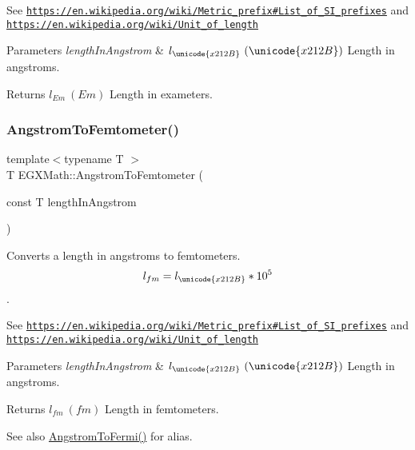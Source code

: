 See \href{https://en.wikipedia.org/wiki/Metric_prefix#List_of_SI_prefixes}{\tt https\+://en.\+wikipedia.\+org/wiki/\+Metric\+\_\+prefix\#\+List\+\_\+of\+\_\+\+S\+I\+\_\+prefixes} and \href{https://en.wikipedia.org/wiki/Unit_of_length}{\tt https\+://en.\+wikipedia.\+org/wiki/\+Unit\+\_\+of\+\_\+length} 
\begin{DoxyParams}{Parameters}
{\em length\+In\+Angstrom} & $ l_{\unicode{x212B}}\ (\unicode{x212B})$ Length in angstroms. \\
\hline
\end{DoxyParams}
\begin{DoxyReturn}{Returns}
$ l_{Em}\ (Em)$ Length in exameters. 
\end{DoxyReturn}
\mbox{\label{group___e_g_x_math-_conversions-_length_conversions-_non-_s_i-_angstrom-_s_i_gae41b2173230daf03a14a4d917c988ffa}} 
\subsubsection{\texorpdfstring{Angstrom\+To\+Femtometer()}{AngstromToFemtometer()}}
{\footnotesize\ttfamily template$<$typename T $>$ \\
T E\+G\+X\+Math\+::\+Angstrom\+To\+Femtometer (\begin{DoxyParamCaption}\item[{const T}]{length\+In\+Angstrom }\end{DoxyParamCaption})}



Converts a length in angstroms to femtometers. \[ l_{fm}=l_{\unicode{x212B}} * 10^{5} \]. 

See \href{https://en.wikipedia.org/wiki/Metric_prefix#List_of_SI_prefixes}{\tt https\+://en.\+wikipedia.\+org/wiki/\+Metric\+\_\+prefix\#\+List\+\_\+of\+\_\+\+S\+I\+\_\+prefixes} and \href{https://en.wikipedia.org/wiki/Unit_of_length}{\tt https\+://en.\+wikipedia.\+org/wiki/\+Unit\+\_\+of\+\_\+length} 
\begin{DoxyParams}{Parameters}
{\em length\+In\+Angstrom} & $ l_{\unicode{x212B}}\ (\unicode{x212B})$ Length in angstroms. \\
\hline
\end{DoxyParams}
\begin{DoxyReturn}{Returns}
$ l_{fm}\ (fm)$ Length in femtometers. 
\end{DoxyReturn}
\begin{DoxySeeAlso}{See also}
\mbox{\hyperlink{group___e_g_x_math-_conversions-_length_conversions-_non-_s_i-_angstrom-_non-_s_i_ga651864e5c83caf88847a00a0b459eaa2}{Angstrom\+To\+Fermi()}} for alias. 
\end{DoxySeeAlso}
\mbox{\label{group___e_g_x_math-_conversions-_length_conversions-_non-_s_i-_angstrom-_s_i_ga4f2ea6df8f1d3bb9dd787d97f8edc64d}} 
